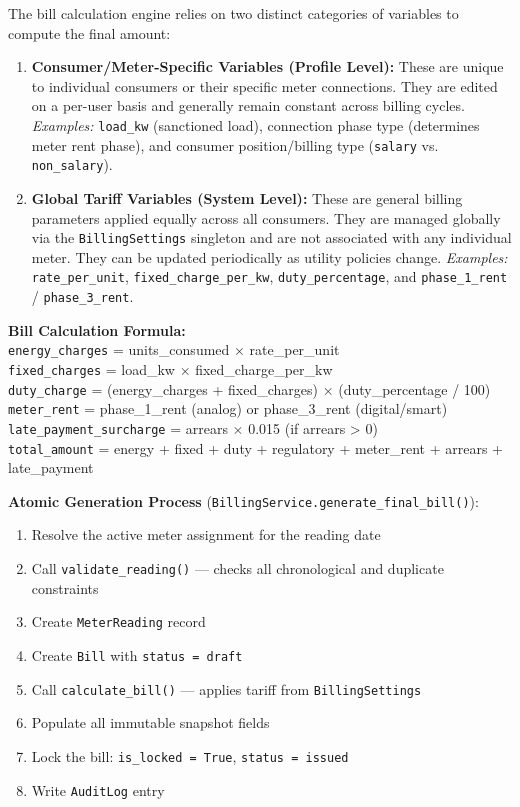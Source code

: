 \documentclass[12pt, a4paper]{report}
\begin{document}
The bill calculation engine relies on two distinct categories of variables to compute the final amount:

\begin{enumerate}[leftmargin=1.8em, itemsep=4pt]
    \item \textbf{Consumer/Meter-Specific Variables (Profile Level):} 
    These are unique to individual consumers or their specific meter connections. They are edited on a per-user basis and generally remain constant across billing cycles. 
    \textit{Examples:} \texttt{load\_kw} (sanctioned load), connection phase type (determines meter rent phase), and consumer position/billing type (\texttt{salary} vs. \texttt{non\_salary}).
    
    \item \textbf{Global Tariff Variables (System Level):} 
    These are general billing parameters applied equally across all consumers. They are managed globally via the \texttt{BillingSettings} singleton and are not associated with any individual meter. They can be updated periodically as utility policies change.
    \textit{Examples:} \texttt{rate\_per\_unit}, \texttt{fixed\_charge\_per\_kw}, \texttt{duty\_percentage}, and \texttt{phase\_1\_rent} / \texttt{phase\_3\_rent}.
\end{enumerate}
\begin{mdframed}[backgroundcolor=codeGray, linecolor=borderColor]
\textbf{Bill Calculation Formula:}\\[0.5em]
\texttt{energy\_charges} = units\_consumed × rate\_per\_unit\\
\texttt{fixed\_charges} = load\_kw × fixed\_charge\_per\_kw\\
\texttt{duty\_charge} = (energy\_charges + fixed\_charges) × (duty\_percentage / 100)\\
\texttt{meter\_rent} = phase\_1\_rent (analog) or phase\_3\_rent (digital/smart)\\
\texttt{late\_payment\_surcharge} = arrears × 0.015 (if arrears > 0)\\[0.5em]
\texttt{total\_amount} = energy + fixed + duty + regulatory + meter\_rent + arrears + late\_payment
\end{mdframed}

\textbf{Atomic Generation Process} (\texttt{BillingService.generate\_final\_bill()}):
\begin{enumerate}[leftmargin=1.8em]
    \item Resolve the active meter assignment for the reading date
    \item Call \texttt{validate\_reading()} — checks all chronological and duplicate constraints
    \item Create \texttt{MeterReading} record
    \item Create \texttt{Bill} with \texttt{status = draft}
    \item Call \texttt{calculate\_bill()} — applies tariff from \texttt{BillingSettings}
    \item Populate all immutable snapshot fields
    \item Lock the bill: \texttt{is\_locked = True}, \texttt{status = issued}
    \item Write \texttt{AuditLog} entry
\end{enumerate}
\end{document}
